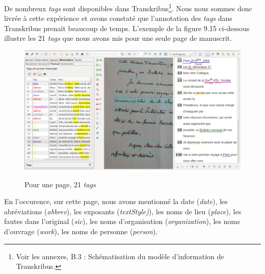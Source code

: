De nombreux \emph{tags} sont disponibles dans Transkribus\footnote{Voir les annexes, B.3 : Schématisation du modèle d'information de Transkribus.}. 
Nous nous sommes donc livrée à cette expérience et avons constaté que l'annotation des \emph{tags} dans Transkribus prenait beaucoup de temps. L'exemple de la figure 9.15 ci-dessous illustre les 21 \emph{tags} que nous avons mis pour une seule page de manuscrit.

 \begin{figure}[ht]
    \centering
    \caption{Pour une page, 21 \emph{tags}}
    \includegraphics[width=16cm]{images/21tagTranskribus.png}
    \label{21tagTranskribus}
\end{figure}

En l'occurence, sur cette page, nous avons mentionné la date (\emph{date}), les abréviations (\emph{abbrev}), les exposants (\emph{textStyle)}), les noms de lieu (\emph{place}), les fautes dans l'original (\emph{sic}), les noms d'organisation (\emph{organization}), les noms d'ouvrage (\emph{work}), les noms de personne (\emph{person}).


